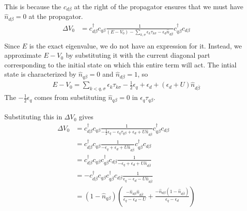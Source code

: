 \documentclass[twoside]{report}
\numberwithin{equation}{section}
\begin{document}
This is because the \(c_{d\beta}\) at the right of the propagator ensures that we must have \(\hat n_{d\beta}=0\) at the propagator.
\begin{equation}\begin{aligned}
	\Delta V_0 &=  c^\dagger_{d\beta}c_{q\beta}\frac{1}{\left(E - V_0\right) - \sum_{k,\sigma}\epsilon_k \tau_{k\sigma} - \epsilon_d \hat n_{d\overline\beta}}c^\dagger_{q\beta}c_{d\beta}\\
\end{aligned}\end{equation}
Since \(E\) is the exact eigenvalue, we do not have an expression for it. Instead, we approximate \(E - V_0\) by substituting it with the current diagonal part corresponding to the initial state on which this entire term will act. The intial state is characterized by \(\hat n_{q\beta}=0\) and \(\hat n_{d\beta} = 1\), so
\begin{equation}\begin{aligned}
	E - V_0= \sum_{k<q,\sigma}\epsilon_k \tau_{k\sigma} - \frac{1}{2}\epsilon_q + \epsilon_d + \left(\epsilon_d + U\right)\hat n_{d\overline\beta}
\end{aligned}\end{equation}
The \(- \frac{1}{2}\epsilon_q\) comes from substituting \(\hat n_{q\beta}=0\) in \(\epsilon_q \tau_{q\beta}\).
\\\\ Substituting this in \(\Delta V_0\) gives
\begin{equation}\begin{aligned}
\Delta V_0 &=  c^\dagger_{d\beta}c_{q\beta}\frac{1}{-\frac{1}{2}\epsilon_q -\epsilon_q \tau_{q\beta} + \epsilon_d + U\hat n_{d\overline\beta}}c^\dagger_{q\beta}c_{d\beta}\\
&=  c^\dagger_{d\beta}c_{q\beta}\frac{1}{-\epsilon_q + \epsilon_d + U\hat n_{d\overline\beta}}c^\dagger_{q\beta}c_{d\beta}\\
&=  c^\dagger_{d\beta}c_{q\beta}c^\dagger_{q\beta}c_{d\beta}\frac{1}{-\epsilon_q + \epsilon_d + U\hat n_{d\overline\beta}}\\
&=  -c^\dagger_{d\beta}c_{q\beta}c^\dagger_{q\beta}c_{d\beta}\frac{1}{\epsilon_q - \epsilon_d - U\hat n_{d\overline\beta}}\\
&=  \left(1 - \hat n_{q\beta}\right)\left(\frac{-\hat n_{d\beta}\hat n_{d\overline\beta}}{\epsilon_q - \epsilon_d - U} + \frac{-\hat n_{d\beta}\left(1 - \hat n_{d\overline\beta}\right)}{\epsilon_q - \epsilon_d}\right)\\
\end{aligned}\end{equation}
\end{document}
